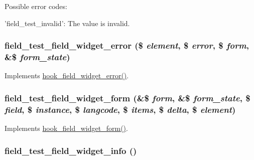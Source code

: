 Possible error codes:
\begin{DoxyItemize}
\item 'field\_\-test\_\-invalid': The value is invalid. 
\end{DoxyItemize}\hypertarget{field__test_8field_8inc_ae8db48aaa8ee647e1b47a88ad7d15279}{
\subsubsection[{field\_\-test\_\-field\_\-widget\_\-error}]{\setlength{\rightskip}{0pt plus 5cm}field\_\-test\_\-field\_\-widget\_\-error (\$ {\em element}, \/  \$ {\em error}, \/  \$ {\em form}, \/  \&\$ {\em form\_\-state})}}
\label{field__test_8field_8inc_ae8db48aaa8ee647e1b47a88ad7d15279}
Implements \hyperlink{group__field__widget_ga9a2031578542fef9e296d79c946431fd}{hook\_\-field\_\-widget\_\-error()}. \hypertarget{field__test_8field_8inc_a1a22b6a97809922fb5bc7d12073b822b}{
\subsubsection[{field\_\-test\_\-field\_\-widget\_\-form}]{\setlength{\rightskip}{0pt plus 5cm}field\_\-test\_\-field\_\-widget\_\-form (\&\$ {\em form}, \/  \&\$ {\em form\_\-state}, \/  \$ {\em field}, \/  \$ {\em instance}, \/  \$ {\em langcode}, \/  \$ {\em items}, \/  \$ {\em delta}, \/  \$ {\em element})}}
\label{field__test_8field_8inc_a1a22b6a97809922fb5bc7d12073b822b}
Implements \hyperlink{group__field__widget_gaa9b0e55fd0eb57ac0f9c7c30d251971b}{hook\_\-field\_\-widget\_\-form()}. \hypertarget{field__test_8field_8inc_aef7269d23d6ee771fbc46a8968aa9ea7}{
\subsubsection[{field\_\-test\_\-field\_\-widget\_\-info}]{\setlength{\rightskip}{0pt plus 5cm}field\_\-test\_\-field\_\-widget\_\-info ()}}
